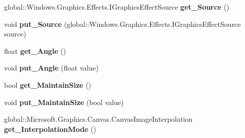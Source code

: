 \begin{DoxyCompactItemize}
global\+::\+Windows.\+Graphics.\+Effects.\+I\+Graphics\+Effect\+Source {\bfseries get\+\_\+\+Source} ()
\item 
\mbox{\label{interface_microsoft_1_1_graphics_1_1_canvas_1_1_effects_1_1_i_straighten_effect_a70f0d6dc9433d17ebdcbe3a4b6b4892c}} 
void {\bfseries put\+\_\+\+Source} (global\+::\+Windows.\+Graphics.\+Effects.\+I\+Graphics\+Effect\+Source source)
\item 
\mbox{\label{interface_microsoft_1_1_graphics_1_1_canvas_1_1_effects_1_1_i_straighten_effect_a4420ccc230f5230df15709e5ac5d785a}} 
float {\bfseries get\+\_\+\+Angle} ()
\item 
\mbox{\label{interface_microsoft_1_1_graphics_1_1_canvas_1_1_effects_1_1_i_straighten_effect_ab42c88ed4087e8529feb2aad22332b17}} 
void {\bfseries put\+\_\+\+Angle} (float value)
\item 
\mbox{\label{interface_microsoft_1_1_graphics_1_1_canvas_1_1_effects_1_1_i_straighten_effect_a42af54b41b4e4299bb05315818ce7183}} 
bool {\bfseries get\+\_\+\+Maintain\+Size} ()
\item 
\mbox{\label{interface_microsoft_1_1_graphics_1_1_canvas_1_1_effects_1_1_i_straighten_effect_a0d1aa7dfd257a41c147868cb49446ea6}} 
void {\bfseries put\+\_\+\+Maintain\+Size} (bool value)
\item 
\mbox{\label{interface_microsoft_1_1_graphics_1_1_canvas_1_1_effects_1_1_i_straighten_effect_aea853ec4accf5f13bcfef15bd59e5170}} 
global\+::\+Microsoft.\+Graphics.\+Canvas.\+Canvas\+Image\+Interpolation {\bfseries get\+\_\+\+Interpolation\+Mode} ()
\item 
\mbox{\label{interface_microsoft_1_1_graphics_1_1_canvas_1_1_effects_1_1_i_straighten_effect_ac4bd6a5d0b94a9b353c7cf0854c55f83}} 

\end{DoxyCompactItemize}
